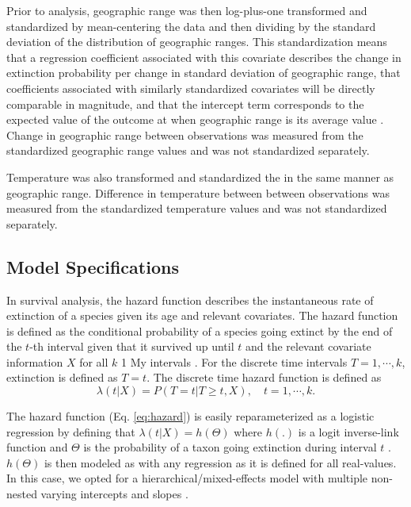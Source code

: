 \documentclass[12pt,letterpaper]{article}
\begin{document}
\begin{refsection}
Prior to analysis, geographic range was then log-plus-one transformed and standardized by mean-centering the data and then dividing by the standard deviation of the distribution of geographic ranges. This standardization means that a regression coefficient associated with this covariate describes the change in extinction probability per change in standard deviation of geographic range, that coefficients associated with similarly standardized covariates will be directly comparable in magnitude, and that the intercept term corresponds to the expected value of the outcome at when geographic range is its average value \citep{ARM}. Change in geographic range between observations was measured from the standardized geographic range values and was not standardized separately.

Temperature was also transformed and standardized the in the same manner as geographic range. Difference in temperature between between observations was measured from the standardized temperature values and was not standardized separately.



\subsection{Model Specifications} \label{sec:model_desc}

In survival analysis, the hazard function describes the instantaneous rate of extinction of a species given its age and relevant covariates. The hazard function is defined as the conditional probability of a species going extinct by the end of the \(t\)-th interval given that it survived up until \(t\) and the relevant covariate information \(X\) for all \(k\) 1 My intervals \citep{Tutz2016}. For the discrete time intervals \(T = 1, \cdots, k\), extinction is defined as \(T = t\). The discrete time hazard function is defined as
\begin{equation}
  \lambda(t | X) = P(T = t | T \geq t, X), \quad t = 1, \cdots, k.
  \label{eq:hazard}
\end{equation}

The hazard function (Eq. \ref{eq:hazard}) is easily reparameterized as a logistic regression by defining that \(\lambda(t | X) = h(\Theta)\) where \(h(.)\) is a logit inverse-link function and \(\Theta\) is the probability of a taxon going extinction during interval \(t\) \citep{Tutz2016}. \(h(\Theta)\) is then modeled as with any regression as it is defined for all real-values. In this case, we opted for a hierarchical/mixed-effects model with multiple non-nested varying intercepts and slopes \citep{ARM}.


\end{refsection}
\end{document}
